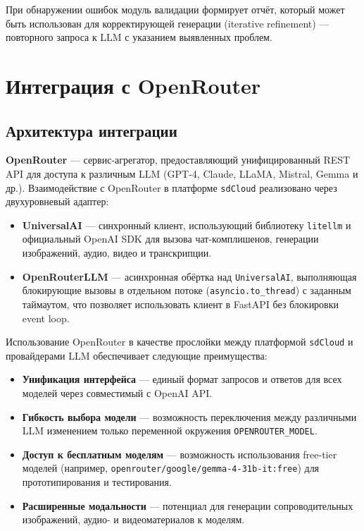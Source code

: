 При обнаружении ошибок модуль валидации формирует отчёт, который может быть использован для корректирующей генерации (iterative refinement) --- повторного запроса к LLM с указанием выявленных проблем.


\section{Интеграция с OpenRouter}

\subsection{Архитектура интеграции}

\textbf{OpenRouter} --- сервис-агрегатор, предоставляющий унифицированный REST API для доступа к различным LLM (GPT-4, Claude, LLaMA, Mistral, Gemma и др.). Взаимодействие с OpenRouter в платформе \texttt{sdCloud} реализовано через двухуровневый адаптер:

\begin{itemize}
    \item \textbf{UniversalAI} --- синхронный клиент, использующий библиотеку \texttt{litellm} и официальный OpenAI SDK для вызова чат-комплишенов, генерации изображений, аудио, видео и транскрипции.
    \item \textbf{OpenRouterLLM} --- асинхронная обёртка над \texttt{UniversalAI}, выполняющая блокирующие вызовы в отдельном потоке (\texttt{asyncio.to\_thread}) с заданным таймаутом, что позволяет использовать клиент в FastAPI без блокировки event loop.
\end{itemize}

Использование OpenRouter в качестве прослойки между платформой \texttt{sdCloud} и провайдерами LLM обеспечивает следующие преимущества:

\begin{itemize}
    \item \textbf{Унификация интерфейса} --- единый формат запросов и ответов для всех моделей через совместимый с OpenAI API.
    \item \textbf{Гибкость выбора модели} --- возможность переключения между различными LLM изменением только переменной окружения \texttt{OPENROUTER\_MODEL}.
    \item \textbf{Доступ к бесплатным моделям} --- возможность использования free-tier моделей (например, \texttt{openrouter/google/gemma-4-31b-it:free}) для прототипирования и тестирования.
    \item \textbf{Расширенные модальности} --- потенциал для генерации сопроводительных изображений, аудио- и видеоматериалов к моделям.
\end{itemize}

